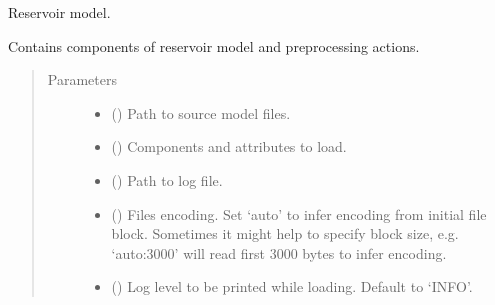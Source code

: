\documentclass[letterpaper,10pt,english]{sphinxmanual}
\begin{document}
\begin{fulllineitems}
\label{\detokenize{api/field:geology.src.Field}}
Reservoir model.

Contains components of reservoir model and preprocessing actions.
\begin{quote}\begin{description}
\item[{Parameters}] \leavevmode\begin{itemize}
\item {} 
 (\sphinxstyleliteralemphasis{\sphinxupquote{, }}) \textendash{} Path to source model files.

\item {} 
 (\sphinxstyleliteralemphasis{\sphinxupquote{, }}) \textendash{} Components and attributes to load.

\item {} 
 (\sphinxstyleliteralemphasis{\sphinxupquote{, }}) \textendash{} Path to log file.

\item {} 
 (\sphinxstyleliteralemphasis{\sphinxupquote{, }}) \textendash{} Files encoding. Set ‘auto’ to infer encoding from initial file block.
Sometimes it might help to specify block size, e.g. ‘auto:3000’ will
read first 3000 bytes to infer encoding.

\item {} 
 (\sphinxstyleliteralemphasis{\sphinxupquote{, }}) \textendash{} Log level to be printed while loading. Default to ‘INFO’.


\end{itemize}
\end{description}
\end{quote}
\end{fulllineitems}
\end{document}
